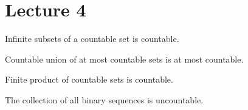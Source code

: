 \documentclass[a4paper]{report}
\begin{document}
\section{Lecture 4}

\begin{definition}[Sequence]
    
\end{definition}

\begin{theorem}[ ] 
   Infinite subsets of a countable set is countable.
\end{theorem}

\begin{remark}
    
\end{remark}

\begin{corollary}[ ]
    
\end{corollary}

\begin{eg}
    
\end{eg}

\begin{eg}[\( \Q  \) is countable]
    
\end{eg}

\begin{theorem}[ ]
   Countable union of at most countable sets is at most countable.
\end{theorem}

\begin{corollary}
    
\end{corollary}

\begin{corollary}
    
\end{corollary}

\begin{theorem}[ ]
   Finite product of countable sets is countable. 
\end{theorem}

\begin{eg}[\( \Q \) is countable]
    
\end{eg}

\begin{theorem}[ ]
   The collection of all binary sequences is uncountable. 
\end{theorem}
\end{document}
